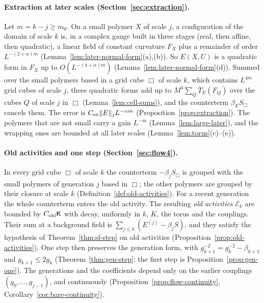 \paragraph{Extraction at later scales (Section~\ref{sec:extraction}).} Let $m=k-j\ge m_0$. On a small polymer $X$ of scale $j$, a configuration of the domain of scale $k$ is, in a complex gauge built in three stages (real, then affine, then quadratic), a linear field of constant curvature $F_X$ plus a remainder of order $L^{-(2+\alpha)m}$ (Lemma~\ref{lem:later-normal-form}(a),(b)). So $E(X,U)$ is a quadratic form in $F_X$ up to $O(L^{-(4+\alpha)m})$ (Lemma~\ref{lem:later-normal-form}(d)). Summed over the small polymers based in a grid cube $\Box$ of scale $k$, which contains $L^{4m}$ grid cubes of scale $j$, these quadratic forms add up to $M^4\sum_Q\bar T_E(F_Q)$ over the cubes $Q$ of scale $j$ in $\Box$ (Lemma~\ref{lem:cell-sums}), and the counterterm $\beta_ES_\Box$ cancels them. The error is $C_{\rm ex}\|E\|_jL^{-\alpha m}$ (Proposition~\ref{prop:extraction}). The polymers that are not small carry a gain $L^{-m}$ (Lemma~\ref{lem:large-later}), and the wrapping ones are bounded at all later scales (Lemma~\ref{lem:torus}(c)--(e)).

\paragraph{Old activities and one step (Section~\ref{sec:flow4}).} In every grid cube $\Box$ of scale $k$ the counterterm $-\beta_jS_\Box$ is grouped with the small polymers of generation $j$ based in $\Box$; the other polymers are grouped by their closure at scale $k$ (Definition~\ref{def:old-activities}). For a recent generation the whole counterterm enters the old activity. The resulting \emph{old activities} $\mathcal E_k$ are bounded by $C_{\rm old}\mathsf K$ with decay, uniformly in $k$, $K$, the torus and the couplings. Their sum at a background field is $\sum_{j\le k}(E^{(j)}-\beta_jS)$, and they satisfy the hypothesis of Theorem~\ref{thm:sf-step} on old activities (Proposition~\ref{prop:old-activities}). One step then preserves the generation form, with $g_{k+1}^{-2}=g_k^{-2}-\beta_{k+1}$ and $g_{k+1}\le2g_k$ (Theorem~\ref{thm:gen-step}; the first step is Proposition~\ref{prop:gen-one}). The generations and the coefficients depend only on the earlier couplings $(g_0,\dots,g_{j-1})$, and continuously (Proposition~\ref{prop:flow-continuity}, Corollary~\ref{cor:bare-continuity}).

